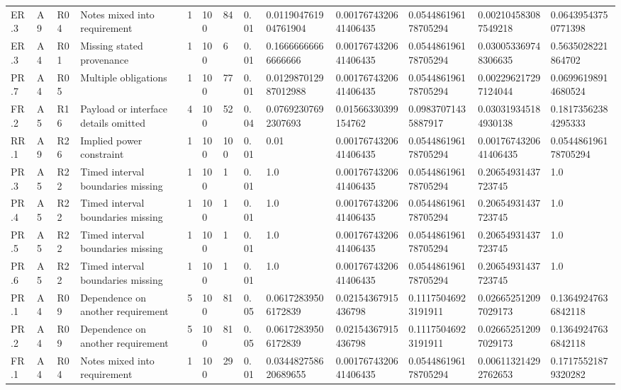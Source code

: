 \begin{tabular}{lllllllllllll}
ER.3 & A9 & R04 & Notes mixed into requirement & 1 & 100 & 84 & 0.01 & 0.011904761904761904 & 0.0017674320641406435 & 0.054486196178705294 & 0.002104583087549218 & 0.06439543750771398 \\
ER.3 & A4 & R01 & Missing stated provenance & 1 & 100 & 6 & 0.01 & 0.16666666666666666 & 0.0017674320641406435 & 0.054486196178705294 & 0.030053369748306635 & 0.5635028221864702 \\
PR.7 & A4 & R05 & Multiple obligations & 1 & 100 & 77 & 0.01 & 0.012987012987012988 & 0.0017674320641406435 & 0.054486196178705294 & 0.002296217297124044 & 0.06996198914680524 \\
FR.2 & A5 & R16 & Payload or interface details omitted & 4 & 100 & 52 & 0.04 & 0.07692307692307693 & 0.01566330399154762 & 0.09837071435887917 & 0.030319345184930138 & 0.18173562384295333 \\
RR.1 & A9 & R26 & Implied power constraint & 1 & 100 & 100 & 0.01 & 0.01 & 0.0017674320641406435 & 0.054486196178705294 & 0.0017674320641406435 & 0.054486196178705294 \\
PR.3 & A5 & R22 & Timed interval boundaries missing & 1 & 100 & 1 & 0.01 & 1.0 & 0.0017674320641406435 & 0.054486196178705294 & 0.20654931437723745 & 1.0 \\
PR.4 & A5 & R22 & Timed interval boundaries missing & 1 & 100 & 1 & 0.01 & 1.0 & 0.0017674320641406435 & 0.054486196178705294 & 0.20654931437723745 & 1.0 \\
PR.5 & A5 & R22 & Timed interval boundaries missing & 1 & 100 & 1 & 0.01 & 1.0 & 0.0017674320641406435 & 0.054486196178705294 & 0.20654931437723745 & 1.0 \\
PR.6 & A5 & R22 & Timed interval boundaries missing & 1 & 100 & 1 & 0.01 & 1.0 & 0.0017674320641406435 & 0.054486196178705294 & 0.20654931437723745 & 1.0 \\
PR.1 & A4 & R09 & Dependence on another requirement & 5 & 100 & 81 & 0.05 & 0.06172839506172839 & 0.02154367915436798 & 0.11175046923191911 & 0.026652512097029173 & 0.13649247636842118 \\
PR.2 & A4 & R09 & Dependence on another requirement & 5 & 100 & 81 & 0.05 & 0.06172839506172839 & 0.02154367915436798 & 0.11175046923191911 & 0.026652512097029173 & 0.13649247636842118 \\
FR.1 & A4 & R04 & Notes mixed into requirement & 1 & 100 & 29 & 0.01 & 0.034482758620689655 & 0.0017674320641406435 & 0.054486196178705294 & 0.006113214292762653 & 0.17175521879320282 \\
\hline
\end{tabular}